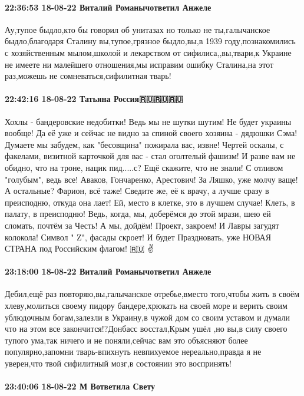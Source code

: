\paragraph{22:36:53 18-08-22 Виталий Романычответил Анжеле}

Ау,тупое быдло,кто бы говорил об унитазах но только не ты,галычанское
быдло,благодаря Сталину вы,тупое,грязное быдло,вы,в 1939 году,познакомились с
хозяйственным мылом,школой и лекарством от сифилиса,,вы,твари,к Украине не
имеете ни малейшего отношения,мы исправим ошибку Сталина,на этот раз,можешь не
сомневаться,сифилитная тварь!

\paragraph{22:42:16 18-08-22 Татьяна Россия🇷🇺🇷🇺🇷🇺}

Хохлы - бандеровские недобитки! Ведь мы не шутки шутим! Не будет украины
вообще! Да её уже и сейчас не видно за спиной своего хозяина - дядюшки Сэма!
Думаете мы забудем, как "бесовщина" пожирала вас, извне! Чертей оскалы, с
факелами, визитной карточкой для вас - стал оголтелый фашизм! И разве вам не
обидно, что на троне, нацик пид.....с? Ещё скажите, что не знали! С отливом
"голубым", ведь все! Аваков, Гончаренко, Арестович! За Ляшко, уже молчу ваще! А
остальные? Фарион, всё таже! Сведите же, её к врачу, а лучше сразу в
преисподню, откуда она лает! Ей, место в клетке, это в лучшем случае! Клеть, в
палату, в преисподню! Ведь, когда, мы, доберёмся до этой мрази, шею ей сломать,
почтём за Честь! А мы, дойдём! Проект, закроем! И Лавры загудят колокола!
Символ " Z", фасады скроет! И будет Праздновать, уже НОВАЯ СТРАНА под
Российским флагом! 🇷🇺 ✌

\paragraph{23:18:00 18-08-22 Виталий Романычответил Анжеле}

Дебил,ещё раз повторяю,вы,галычанское отребье,вместо того,чтобы жить в своём
хлеву,молиться своему пидору бандере,хрюкать на своей море и верить своим
ублюдочным богам,залезли в Украину,в чужой дом со своим уставом и думали что на
этом все закончится!?Донбасс восстал,Крым ушёл ,но вы,в силу своего тупого
ума,так ничего и не поняли,сейчас вам это объясняют более популярно,запомни
тварь-впихнуть невпихуемое нереально,правда я не уверен,что твой сифилитный
мозг,в состоянии это воспринять!

\paragraph{23:40:06 18-08-22 М Вответила Свету}

